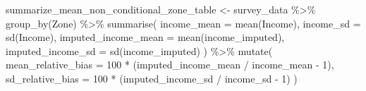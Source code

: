 \documentclass[
  spanish,
  11pt,
  letterpaper,
  oneside,
  open=any]{scrbook}
\newenvironment{Shaded}{\begin{snugshade}}{\end{snugshade}}
\newcommand{\AttributeTok}[1]{\textcolor[rgb]{0.40,0.45,0.13}{#1}}
\newcommand{\DecValTok}[1]{\textcolor[rgb]{0.68,0.00,0.00}{#1}}
\newcommand{\FunctionTok}[1]{\textcolor[rgb]{0.28,0.35,0.67}{#1}}
\newcommand{\NormalTok}[1]{\textcolor[rgb]{0.00,0.23,0.31}{#1}}
\newcommand{\OtherTok}[1]{\textcolor[rgb]{0.00,0.23,0.31}{#1}}
\newcommand{\SpecialCharTok}[1]{\textcolor[rgb]{0.37,0.37,0.37}{#1}}
\begin{document}
\begin{Shaded}
\begin{Highlighting}[]
\NormalTok{summarize\_mean\_non\_conditional\_zone\_table }\OtherTok{\textless{}{-}}\NormalTok{ survey\_data }\SpecialCharTok{\%\textgreater{}\%}
  \FunctionTok{group\_by}\NormalTok{(Zone) }\SpecialCharTok{\%\textgreater{}\%}
  \FunctionTok{summarise}\NormalTok{(}
    \AttributeTok{income\_mean =} \FunctionTok{mean}\NormalTok{(Income),}
    \AttributeTok{income\_sd =} \FunctionTok{sd}\NormalTok{(Income),}
    \AttributeTok{imputed\_income\_mean =} \FunctionTok{mean}\NormalTok{(income\_imputed),}
    \AttributeTok{imputed\_income\_sd =} \FunctionTok{sd}\NormalTok{(income\_imputed)}
\NormalTok{  ) }\SpecialCharTok{\%\textgreater{}\%}
  \FunctionTok{mutate}\NormalTok{(}
    \AttributeTok{mean\_relative\_bias =} \DecValTok{100} \SpecialCharTok{*}\NormalTok{ (imputed\_income\_mean }\SpecialCharTok{/}\NormalTok{ income\_mean }\SpecialCharTok{{-}} \DecValTok{1}\NormalTok{),}
    \AttributeTok{sd\_relative\_bias =} \DecValTok{100} \SpecialCharTok{*}\NormalTok{ (imputed\_income\_sd }\SpecialCharTok{/}\NormalTok{ income\_sd }\SpecialCharTok{{-}} \DecValTok{1}\NormalTok{)}
\NormalTok{  )}
\end{Highlighting}
\end{Shaded}
\end{document}
